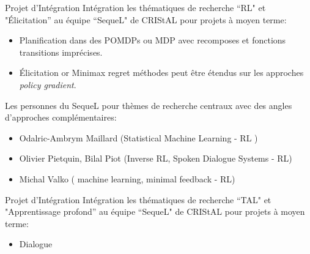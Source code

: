 \begin{frame}{Projet d'Intégration}
Intégration les thématiques de recherche ``RL" et "\'Elicitation” au équipe ``SequeL" de CRIStAL pour projets à moyen terme:
\begin{block}

\begin{itemize}
	\item Planification dans des POMDPs ou MDP avec recomposes et fonctions transitions imprécises. 
	\item Élicitation or Minimax regret méthodes peut être étendus sur les approches \textit{policy gradient}.
\end{itemize}
\end{block}

Les personnes du SequeL pour thèmes de recherche centraux avec des angles d’approches complémentaires:
\begin{block}

\begin{itemize}
	\item  Odalric-Ambrym Maillard (Statistical Machine Learning - RL )
	\item  Olivier Pietquin, Bilal Piot (Inverse RL, Spoken Dialogue Systems - RL)
	\item  Michal Valko ( machine learning, minimal feedback - RL)
	\end{itemize}
\end{block}
\end{frame}

\begin{frame}{Projet d'Intégration}
Intégration les thématiques de recherche ``TAL" et "Apprentissage profond” au équipe ``SequeL" de CRIStAL pour projets à moyen terme:
\begin{block}{}
	\begin{itemize}
		\item Dialogue 
	\end{itemize}
\end{block}

\end{frame}